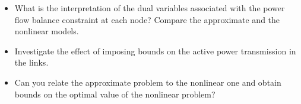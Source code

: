 \begin{itemize}
    \item What is the interpretation of the dual variables associated with the power flow balance
    constraint at each node? Compare the approximate and the nonlinear models.

    \item Investigate the effect of imposing bounds on the active power transmission in the
    links.
    
    \item Can you relate the approximate problem to the nonlinear one and obtain bounds on
    the optimal value of the nonlinear problem?

\end{itemize}


